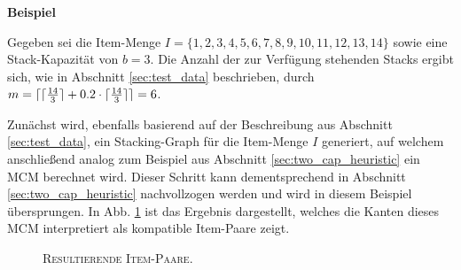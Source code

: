 \textbf{Beispiel}

Gegeben sei die Item-Menge $I = \{1, 2, 3, 4, 5, 6, 7, 8, 9, 10, 11, 12, 13, 14\}$ sowie eine Stack-Kapazität von $b = 3$.
Die Anzahl der zur Verfügung stehenden Stacks ergibt sich, wie in Abschnitt \ref{sec:test_data} beschrieben,
durch $m = \lceil\lceil\frac{14}{3}\rceil + 0.2 \cdot  \lceil\frac{14}{3}\rceil\rceil = 6$.

Zunächst wird, ebenfalls basierend auf der Beschreibung aus Abschnitt \ref{sec:test_data}, ein Stacking-Graph
für die Item-Menge $I$ generiert, auf welchem anschließend analog zum Beispiel aus Abschnitt \ref{sec:two_cap_heuristic} ein
\textsc{MCM} berechnet wird. Dieser Schritt kann dementsprechend in Abschnitt \ref{sec:two_cap_heuristic} nachvollzogen werden
und wird in diesem Beispiel übersprungen. In Abb. \ref{fig:item_pairs_example_b=3} ist das Ergebnis dargestellt,
welches die Kanten dieses \textsc{MCM} interpretiert als kompatible Item-Paare zeigt.

\begin{figure}[H]
\centering
{}
\caption{\textsc{Resultierende Item-Paare}.}
\label{fig:item_pairs_example_b=3}
\end{figure}

